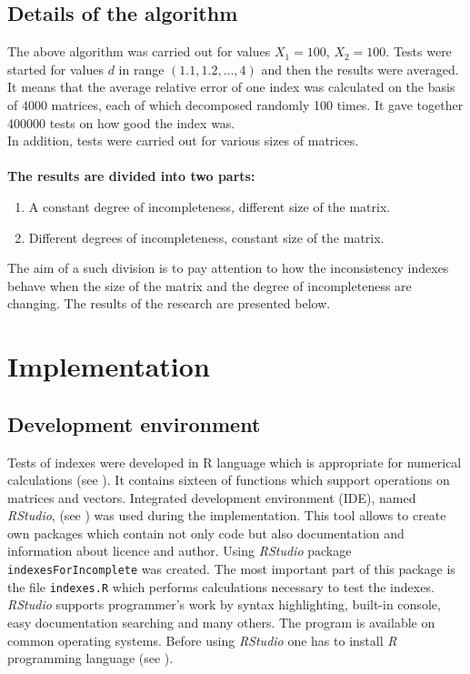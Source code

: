 \subsection{Details of the algorithm}
\label{sec:details}
The above algorithm was carried out for values $X_{1}=100$, $X_{2}=100$. Tests were started for values $d$ in range $\left(1.1,1.2,...,4\right)$ and then the results were averaged. It means that the average relative error of one index was calculated on the basis of 4000 matrices, each of which decomposed randomly 100 times. It gave together 400000 tests on how good the index was. 
\\
In addition, tests were carried out for various sizes of matrices.
\\
\\
\textbf{The results are divided into two parts:}
\begin{enumerate}
  \item A constant degree of incompleteness, different size of the matrix.
  \item Different degrees of incompleteness, constant size of the matrix.
\end{enumerate}

The aim of a such division is to pay attention to how the inconsistency indexes behave when the size of the matrix and the degree of incompleteness are changing. The results of the research are presented below.


\section{Implementation}

\subsection{Development environment}
Tests of indexes were developed in R language which is appropriate for numerical calculations (see \cite{projectR}). It contains sixteen of functions which support operations on matrices and vectors. Integrated development environment (IDE), named \textit{RStudio}, (see \cite{studioR}) was used during the implementation. This tool allows to create own packages which contain not only code but also documentation and information about licence and author. Using \textit{RStudio} package \texttt{indexesForIncomplete} was created. The most important part of this package is the file \texttt{indexes.R} which performs calculations necessary to test the indexes. \textit{RStudio} supports programmer's work by syntax highlighting, built-in console, easy documentation searching and many others. The program is available on common operating systems. Before using \textit{RStudio} one has to install \textit{R} programming language (see \cite{installR}).  



